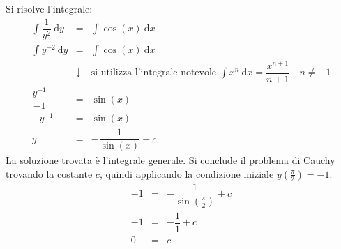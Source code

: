 \documentclass[a4paper]{article}
\begin{document}
	\noindent
	Si risolve l'integrale:
	\begin{equation*}
		\begin{array}{rcl}
			\displaystyle\int \dfrac{1}{y^{2}} \: \mathrm{d}y &=& \displaystyle\int \cos\left(x\right) \: \mathrm{d}x \\ [1em]
			\displaystyle\int y^{-2} \: \mathrm{d}y &=& \displaystyle\int \cos\left(x\right) \: \mathrm{d}x \\ [1em]
			&\downarrow& \text{si utilizza l'integrale notevole } \displaystyle\int x^{n} \:\mathrm{d}x = \dfrac{x^{n+1}}{n+1} \hspace{1em} n \ne -1 \\ [1em]
			\dfrac{y^{-1}}{-1} &=& \sin\left(x\right) \\ [1em]
			-y^{-1} &=& \sin\left(x\right) \\ [.5em]
			y &=& -\dfrac{1}{\sin\left(x\right)} + c
		\end{array}
	\end{equation*}
	La soluzione trovata è l'integrale generale. Si conclude il problema di Cauchy trovando la costante $c$, quindi applicando la condizione iniziale $y\left(\frac{\pi}{2}\right)=-1$:
	\begin{equation*}
		\begin{array}{rcl}
			-1 &=& -\dfrac{1}{\sin\left(\frac{\pi}{2}\right)} + c \\ [1em]
			-1 &=& -\dfrac{1}{1} + c \\ [1em]
			0 &=& c
		\end{array}
	\end{equation*}\newpage
\end{document}
